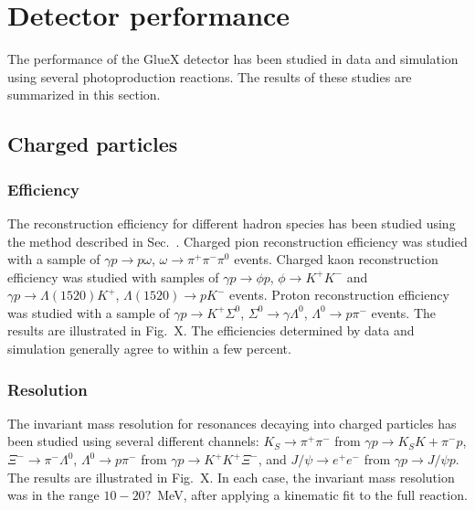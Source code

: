 
\section[Detector performance (Sean)]{Detector performance \label{sec:performance}}

The performance of the GlueX detector has been studied in data and simulation using several photoproduction reactions.  The results of these studies are summarized in this section.

\subsection{Charged particles \label{sec:perfcharged}}

\subsubsection{Efficiency \label{sec:perfchargedeff}}

The reconstruction efficiency for different hadron species has been studied using the method described in Sec.~.   Charged pion reconstruction efficiency was studied with a sample of $\gamma p \to p \omega$, $\omega \to \pi^+\pi^-\pi^0$ events.  Charged kaon reconstruction efficiency was studied with samples of $\gamma p \to \phi p$, $\phi \to K^+K^-$ and $\gamma p \to \Lambda(1520) K^+$, $\Lambda(1520) \to p K^-$ events.  Proton reconstruction efficiency was studied with a sample of $\gamma p \to K^+ \Sigma^0$, $\Sigma^0 \to \gamma \Lambda^0$, $\Lambda^0 \to p \pi^-$ events.  
The results are illustrated in Fig.~X. The efficiencies determined by data and simulation generally agree to within a few percent.

\subsubsection{Resolution \label{sec:perfchargedresol}}

The invariant mass resolution for resonances decaying into charged particles has been studied using several different channels:  $K_S\to\pi^+\pi^-$ from $\gamma p \to K_S K+ \pi^- p$, $\Xi^- \to \pi^- \Lambda^0$, $\Lambda^0 \to p \pi^-$ from $\gamma p \to K^+ K^+ \Xi^-$, and $J/\psi \to e^+ e^-$ from $\gamma p \to J/\psi p$.  The results are illustrated in Fig.~X.  In each case, the invariant mass resolution was in the range $10-20?$~MeV, after applying a kinematic fit to the full reaction.

